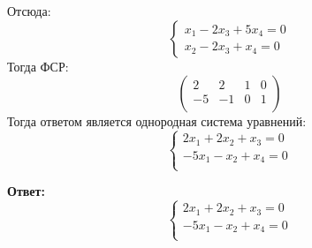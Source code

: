\documentclass[a4paper,12pt]{article}
\begin{document}
Отсюда:
\[
\begin{cases}
x_1 -2x_3 + 5x_4 = 0 \\
x_2 - 2x_3 + x_4 = 0
\end{cases}
\]
Тогда ФСР:
\[
\begin{pmatrix}
2 & 2 & 1 & 0 \\
-5 & -1 & 0 & 1\\
\end{pmatrix}
\]
Тогда ответом является однородная система уравнений:
\[
\begin{cases}
2x_1+ 2x_2 + x_3 = 0 \\
-5x_1 - x_2 + x_4  = 0\\ 
\end{cases}
\]
{\large \begin{center}
\textbf{Ответ:} 
\[
\begin{cases}
2x_1+ 2x_2 + x_3 = 0 \\
-5x_1 - x_2 + x_4  = 0\\ 
\end{cases}
\]
\end{center}}
\clearpage
\end{document}
